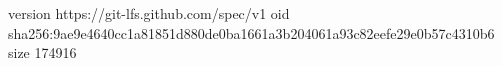 version https://git-lfs.github.com/spec/v1
oid sha256:9ae9e4640cc1a81851d880de0ba1661a3b204061a93c82eefe29e0b57c4310b6
size 174916
